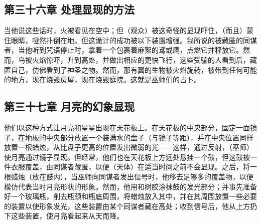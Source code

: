 \par


\subsection{第三十六章 处理显现的方法}

当他说这些话时，火被看见在空中；但（观众）被这奇怪的显现吓住，（而且）蒙住眼睛，哑然扑倒在地。但这诡计的成功被以下装置增强。我所说的被藏匿的同谋者，当他听到咒语停止时，拿着一个包裹着麻絮的鸢或鹰，点燃它并释放它。然而，鸟被火焰惊吓，升到高处，并做出相应的更快飞行，这些受骗的人看到后，藏匿自己，仿佛看到了神圣之物。然而，那有翼的生物被火焰旋转，被带到任何可能的地方，现在烧毁房屋，现在烧毁庭院。这就是巫师们的占卜。\par


\subsection{第三十七章 月亮的幻象显现}

他们以这种方式让月亮和星星出现在天花板上。在天花板的中央部分，固定一面镜子，在地板的中央部分放置一个装满水的盘子（与镜子等距），并在中央位置同样放置一根蜡烛，从比盘子更高的位置发出微弱的光——这样，通过反射，（巫师）使月亮通过镜子显现。但经常，他们也在天花板上方远处悬挂一个鼓，但这鼓被一件衣服覆盖，由同谋者藏匿，以便（天体）在适当时间之前不会显现。之后，将一根蜡烛（放在鼓内），当巫师向同谋者发出信号时，他移去足够多的覆盖物，以便模仿代表当时月亮形状的形象。然而，他用和树胶涂抹鼓的发光部分；并事先准备好一个玻璃瓶，削去瓶颈和瓶底周围，将蜡烛放入其中，并在其周围放置一些必要的装置以使形象发光，这些装置由某个同谋者藏在高处；收到信号后，他从上方扔下这些装置，使月亮看起来从天而降。\par

